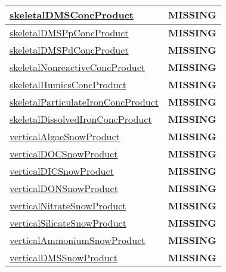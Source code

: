 {\begin{center}
\begin{longtable}{| p{2.0in} | p{4.0in} |}
    \hline
    \hyperref[subsec:var_sec_tracer_products_skeletalDMSConcProduct]{skeletalDMSConcProduct} & {\bf \color{red} MISSING} \\
    \hline
    \hyperref[subsec:var_sec_tracer_products_skeletalDMSPpConcProduct]{skeletalDMSPpConcProduct} & {\bf \color{red} MISSING} \\
    \hline
    \hyperref[subsec:var_sec_tracer_products_skeletalDMSPdConcProduct]{skeletalDMSPdConcProduct} & {\bf \color{red} MISSING} \\
    \hline
    \hyperref[subsec:var_sec_tracer_products_skeletalNonreactiveConcProduct]{skeletalNonreactiveConcProduct} & {\bf \color{red} MISSING} \\
    \hline
    \hyperref[subsec:var_sec_tracer_products_skeletalHumicsConcProduct]{skeletalHumicsConcProduct} & {\bf \color{red} MISSING} \\
    \hline
    \hyperref[subsec:var_sec_tracer_products_skeletalParticulateIronConcProduct]{skeletalParticulateIronConc\-Product} & {\bf \color{red} MISSING} \\
    \hline
    \hyperref[subsec:var_sec_tracer_products_skeletalDissolvedIronConcProduct]{skeletalDissolvedIronConc\-Product} & {\bf \color{red} MISSING} \\
    \hline
    \hyperref[subsec:var_sec_tracer_products_verticalAlgaeSnowProduct]{verticalAlgaeSnowProduct} & {\bf \color{red} MISSING} \\
    \hline
    \hyperref[subsec:var_sec_tracer_products_verticalDOCSnowProduct]{verticalDOCSnowProduct} & {\bf \color{red} MISSING} \\
    \hline
    \hyperref[subsec:var_sec_tracer_products_verticalDICSnowProduct]{verticalDICSnowProduct} & {\bf \color{red} MISSING} \\
    \hline
    \hyperref[subsec:var_sec_tracer_products_verticalDONSnowProduct]{verticalDONSnowProduct} & {\bf \color{red} MISSING} \\
    \hline
    \hyperref[subsec:var_sec_tracer_products_verticalNitrateSnowProduct]{verticalNitrateSnowProduct} & {\bf \color{red} MISSING} \\
    \hline
    \hyperref[subsec:var_sec_tracer_products_verticalSilicateSnowProduct]{verticalSilicateSnowProduct} & {\bf \color{red} MISSING} \\
    \hline
    \hyperref[subsec:var_sec_tracer_products_verticalAmmoniumSnowProduct]{verticalAmmoniumSnowProduct} & {\bf \color{red} MISSING} \\
    \hline
    \hyperref[subsec:var_sec_tracer_products_verticalDMSSnowProduct]{verticalDMSSnowProduct} & {\bf \color{red} MISSING} \\

\end{longtable}
\end{center}}
